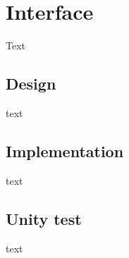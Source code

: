 \section{Interface}
Text

\subsection{Design}
text

\subsection{Implementation}
text

\subsection{Unity test}
text